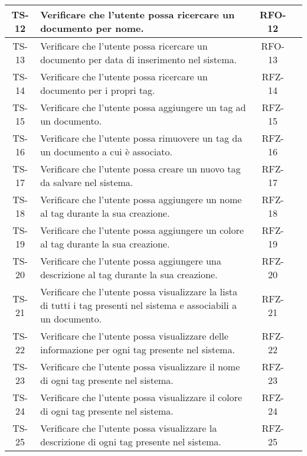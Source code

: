 \begin{xltabular}{\textwidth}{| c | X | c | c |}
    \hline
    TS-12 & Verificare che l’utente possa ricercare un documento per nome. & RFO-12 & \textcolor{cmarkcolor}{}\\
    \hline
    TS-13 & Verificare che l’utente possa ricercare un documento per data di inserimento nel sistema. & RFO-13 & \textcolor{cmarkcolor}{} \\
    \hline
    TS-14 & Verificare che l’utente possa ricercare un documento per i propri tag. & RFZ-14 & \textcolor{xmarkcolor}{} \\
    \hline
    TS-15 & Verificare che l’utente possa aggiungere un tag ad un documento. & RFZ-15 & \textcolor{cmarkcolor}{} \\
    \hline
    TS-16 & Verificare che l’utente possa rimuovere un tag da un documento a cui è associato. & RFZ-16 & \textcolor{cmarkcolor}{} \\
    \hline
    TS-17 & Verificare che l’utente possa creare un nuovo tag da salvare nel sistema. & RFZ-17 & \textcolor{xmarkcolor}{} \\
    \hline
    TS-18 & Verificare che l’utente possa aggiungere un nome al tag durante la sua creazione. & RFZ-18 & \textcolor{xmarkcolor}{} \\
    \hline
    TS-19 & Verificare che l’utente possa aggiungere un colore al tag durante la sua creazione. & RFZ-19 & \textcolor{xmarkcolor}{} \\
    \hline
    TS-20 & Verificare che l’utente possa aggiungere una descrizione al tag durante la sua creazione. & RFZ-20 & \textcolor{xmarkcolor}{} \\
    \hline
    TS-21 &  Verificare che l’utente possa visualizzare la lista di tutti i tag presenti nel sistema e associabili a un documento. & RFZ-21 & \textcolor{xmarkcolor}{} \\
    \hline
    TS-22 & Verificare che l'utente possa visualizzare delle informazione per ogni tag presente nel sistema. & RFZ-22 & \textcolor{xmarkcolor}{} \\
    \hline
    TS-23 & Verificare che l'utente possa visualizzare il nome di ogni tag presente nel sistema. & RFZ-23 & \textcolor{xmarkcolor}{} \\
    \hline
    TS-24 & Verificare che l’utente possa visualizzare il colore di ogni tag presente nel sistema. & RFZ-24 & \textcolor{xmarkcolor}{} \\
    \hline
    TS-25 & Verificare che l’utente possa visualizzare la descrizione di ogni tag presente nel sistema. & RFZ-25 & \textcolor{xmarkcolor}{} \\

\end{xltabular}
